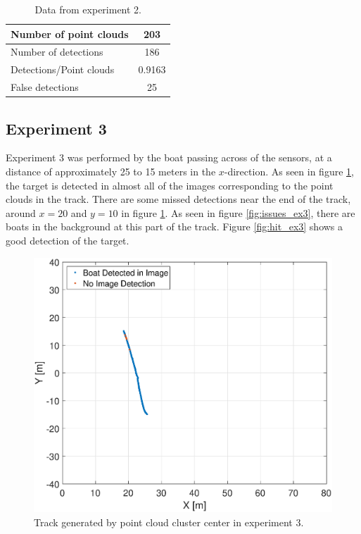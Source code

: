 \begin{table}[H]
	\centering
	\begin{tabularx}{.7\linewidth}{L c}
		\toprule
		Number of point clouds & 203\\
		\midrule
		Number of detections & 186\\
		\midrule
		Detections/Point clouds & 0.9163 \\
		\midrule
		False detections & 25\\
		\bottomrule
	\end{tabularx}
	\caption{Data from experiment 2.}
	\label{tab:exp2}
\end{table}

\subsection{Experiment 3}
Experiment 3 was performed by the boat passing across of the sensors, at a distance of approximately 25 to 15 meters in the $x$-direction. As seen in figure \ref{fig:ex3_track}, the target is detected in almost all of the images corresponding to the point clouds in the track. There are some missed detections near the end of the track, around $x=20$ and $y=10$ in figure \ref{fig:ex3_track}. As seen in figure \ref{fig:issues_ex3}, there are boats in the background at this part of the track. Figure \ref{fig:hit_ex3} shows a good detection of the target.
\begin{figure}[h]
	\centering
	\includegraphics[width=.8\linewidth]{fig/exp_3_track.eps}
	\caption{Track generated by point cloud cluster center in experiment 3.}
	\label{fig:ex3_track}
\end{figure}
